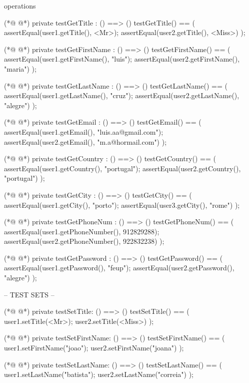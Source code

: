 \begin{vdmpp}[breaklines=true]
operations

(*@
\label{testGetTitle:133}
@*)
 private testGetTitle : () ==> ()
  testGetTitle() == 
  (
   assertEqual(user1.getTitle(), <Mr>);
   assertEqual(user2.getTitle(), <Miss>)
  );
  
(*@
\label{testGetFirstName:140}
@*)
 private testGetFirstName : () ==> ()
  testGetFirstName() == 
  (
   assertEqual(user1.getFirstName(), "luis");
   assertEqual(user2.getFirstName(), "maria")
  );
  
(*@
\label{testGetLastName:147}
@*)
 private testGetLastName : () ==> ()
  testGetLastName() == 
  (
   assertEqual(user1.getLastName(), "cruz");
   assertEqual(user2.getLastName(), "alegre")
  );
  
(*@
\label{testGetEmail:154}
@*)
 private testGetEmail : () ==> ()
  testGetEmail() == 
  (
   assertEqual(user1.getEmail(), "luis.aa@gmail.com");
   assertEqual(user2.getEmail(), "m.a@hormail.com")
  );
  
(*@
\label{testGetCountry:161}
@*)
 private testGetCountry : () ==> ()
  testGetCountry() == 
  (
   assertEqual(user1.getCountry(), "portugal");
   assertEqual(user2.getCountry(), "portugal")
  );
  
(*@
\label{testGetCity:168}
@*)
 private testGetCity : () ==> ()
  testGetCity() == 
  (
   assertEqual(user1.getCity(), "porto");
   assertEqual(user3.getCity(), "rome")
  );
  
(*@
\label{testGetPhoneNum:175}
@*)
 private testGetPhoneNum : () ==> ()
  testGetPhoneNum() == 
  (
   assertEqual(user1.getPhoneNumber(), 912829288);
   assertEqual(user2.getPhoneNumber(), 922832238)
  );
 
(*@
\label{testGetPassword:182}
@*)
 private testGetPassword : () ==> ()
  testGetPassword() == 
  (
   assertEqual(user1.getPassword(), "feup");
   assertEqual(user2.getPassword(), "alegre")
  );
  
 -- TEST SETS --
 
(*@
\label{testSetTitle:191}
@*)
 private testSetTitle: () ==> ()
  testSetTitle() ==
  (
   user1.setTitle(<Mr>);
   user2.setTitle(<Miss>)
  );
  
(*@
\label{testSetFirstName:198}
@*)
 private testSetFirstName: () ==> ()
  testSetFirstName() ==
  (
   user1.setFirstName("joao");
   user2.setFirstName("joana")
  );
  
(*@
\label{testSetLastName:205}
@*)
 private testSetLastName: () ==> ()
  testSetLastName() ==
  (
   user1.setLastName("batista");
   user2.setLastName("correia")
  );
  

\end{vdmpp}
